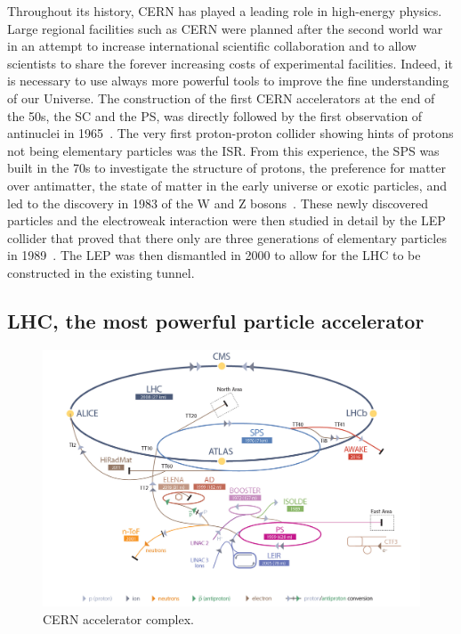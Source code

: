 	Throughout its history, CERN has played a leading role in high-energy physics. Large regional facilities such as CERN were planned after the second world war in an attempt to increase international scientific collaboration and to allow scientists to share the forever increasing costs of experimental facilities. Indeed, it is necessary to use always more powerful tools to improve the fine understanding of our Universe. The construction of the first CERN accelerators at the end of the 50s, the \acf{SC} and the \acf{PS}, was directly followed by the first observation of antinuclei in 1965~\cite{MASSAM1965}. The very first proton-proton collider showing hints of protons not being elementary particles was the \acf{ISR}. From this experience, the \acf{SPS} was built in the 70s to investigate the structure of protons, the preference for matter over antimatter, the state of matter in the early universe or exotic particles, and led to the discovery in 1983 of the W and Z bosons~\cite{UA1W1983,UA2W1983,UA1Z1983,UA2Z1983}. These newly discovered particles and the electroweak interaction were then studied in detail by the \acf{LEP} collider that proved that there only are three generations of elementary particles in 1989~\cite{ALEPH1989}. The LEP was then dismantled in 2000 to allow for the LHC to be constructed in the existing tunnel.

	\subsection{LHC, the most powerful particle accelerator}
	\label{chapt2:ssec:LHC}

	\begin{figure}[H]
		\centering
		\includegraphics[width=\linewidth]{fig/chapt2/CERN_Accelerator_Complex.png}
		\caption{\label{fig:CERNComplex} CERN accelerator complex.}
	\end{figure}
	
